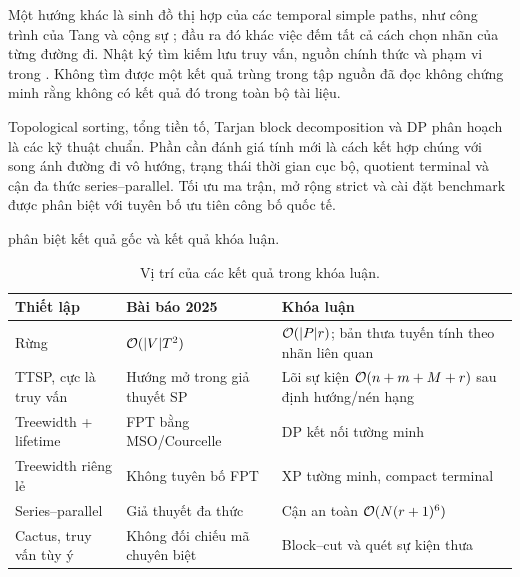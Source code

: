 Một hướng khác là sinh đồ thị hợp của các temporal simple paths, như công trình của Tang và cộng sự \cite{tang2025}; đầu ra đó khác việc đếm tất cả cách chọn nhãn của từng đường đi. Nhật ký tìm kiếm lưu truy vấn, nguồn chính thức và phạm vi trong . Không tìm được một kết quả trùng trong tập nguồn đã đọc không chứng minh rằng không có kết quả đó trong toàn bộ tài liệu.

Topological sorting, tổng tiền tố, Tarjan block decomposition và DP phân hoạch là các kỹ thuật chuẩn. Phần cần đánh giá tính mới là cách kết hợp chúng với song ánh đường đi vô hướng, trạng thái thời gian cục bộ, quotient terminal và cận đa thức series--parallel. Tối ưu ma trận, mở rộng strict và cài đặt benchmark được phân biệt với tuyên bố ưu tiên công bố quốc tế.

 phân biệt kết quả gốc và kết quả khóa luận.

\begin{table}[htbp]
\centering
\caption{Vị trí của các kết quả trong khóa luận.}
\label{tab:positioning}
\begin{tabularx}{\textwidth}{>{\raggedright\arraybackslash}p{3.1cm}XX}
\toprule
Thiết lập & Bài báo 2025 & Khóa luận \\
\midrule
Rừng & $\mathcal{O}(|V|T^2)$ & $\mathcal{O}(|P|r)$; bản thưa tuyến tính theo nhãn liên quan \\
TTSP, cực là truy vấn & Hướng mở trong giả thuyết SP & Lõi sự kiện $\mathcal{O}(n+m+M+r)$ sau định hướng/nén hạng \\
Treewidth + lifetime & FPT bằng MSO/Courcelle & DP kết nối tường minh \\
Treewidth riêng lẻ & Không tuyên bố FPT & XP tường minh, compact terminal \\
Series--parallel & Giả thuyết đa thức & Cận an toàn $\mathcal{O}(N(r+1)^6)$ \\
Cactus, truy vấn tùy ý & Không đối chiếu mã chuyên biệt & Block--cut và quét sự kiện thưa \\
\bottomrule
\end{tabularx}
\end{table}

